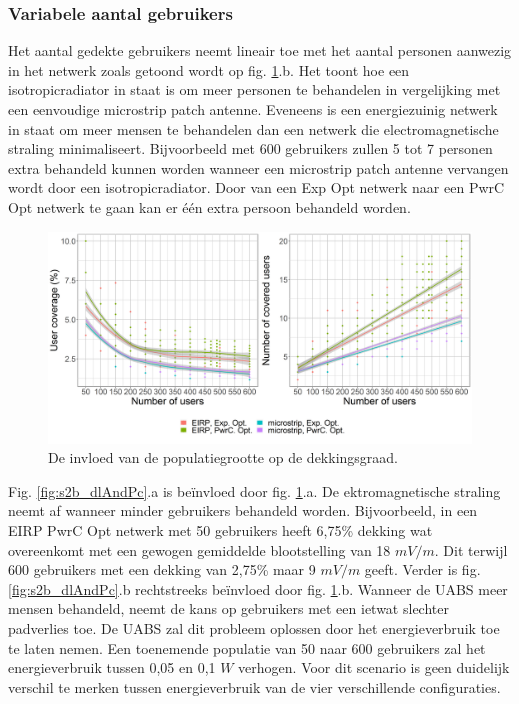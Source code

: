 \documentclass[twocolumn]{phdsymp_dutch}
\begin{document}
\subsubsection{Variabele aantal gebruikers}
Het aantal gedekte gebruikers neemt lineair toe met het aantal personen aanwezig in het netwerk zoals getoond wordt op fig.
\ref{fig:s2uvsnumcovusers}.b. Het toont hoe een \gls{isotropicradiator} in staat is om meer personen te behandelen in vergelijking met een eenvoudige
 microstrip patch antenne. Eveneens is een energiezuinig netwerk in staat om meer mensen te behandelen dan een netwerk die electromagnetische straling minimaliseert.
 Bijvoorbeeld met 600 gebruikers zullen 5 tot 7 personen extra behandeld kunnen worden wanneer 
 een microstrip patch antenne vervangen wordt door een  \gls{isotropicradiator}.
Door van een \gls{Exp Opt} netwerk naar een \gls{PwrC Opt} netwerk te gaan kan er \'e\'en extra persoon 
behandeld worden.

\begin{figure}[h!]
  \includegraphics[width=\linewidth]{s2/uvsnumdronesAndCov.png}
  \caption{De invloed van de populatiegrootte op de dekkingsgraad.}
  \label{fig:s2uvsnumcovusers}
\end{figure}

Fig. \ref{fig:s2b_dlAndPc}.a  is be\"invloed door fig. \ref{fig:s2uvsnumcovusers}.a. 
De ektromagnetische straling neemt af wanneer minder gebruikers behandeld worden.
Bijvoorbeeld, in een EIRP \gls{PwrC Opt} netwerk met 50 gebruikers heeft 6,75\%
dekking wat overeenkomt met een gewogen gemiddelde blootstelling van 18 $mV/m$. Dit terwijl
 600 gebruikers met een dekking van 2,75\% maar 9 $mV/m$ geeft.
Verder is fig. \ref{fig:s2b_dlAndPc}.b rechtstreeks be\"invloed door fig.  \ref{fig:s2uvsnumcovusers}.b.
Wanneer de \gls{UABS} meer mensen behandeld, neemt de kans op gebruikers met een ietwat slechter padverlies toe.
De  \gls{UABS} zal dit probleem oplossen door het energieverbruik toe te laten nemen.
Een toenemende populatie van 50 naar 600 gebruikers zal het energieverbruik tussen 0,05 en 0,1 $W$ verhogen.
Voor dit scenario is geen duidelijk verschil te merken tussen energieverbruik van de vier verschillende configuraties.
\end{document}
